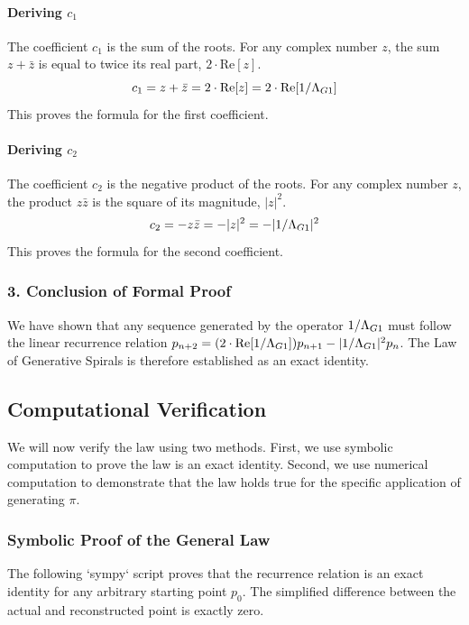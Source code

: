 \paragraph{Deriving $c_1$}
The coefficient $c_1$ is the sum of the roots. For any complex number $z$, the sum $z+\bar{z}$ is equal to twice its real part, $2 \cdot \text{Re}[z]$.
$$ c_1 = z + \bar{z} = 2 \cdot \text{Re}[z] = 2 \cdot \text{Re}[1/\Lambda_{G1}] $$
This proves the formula for the first coefficient.

\paragraph{Deriving $c_2$}
The coefficient $c_2$ is the negative product of the roots. For any complex number $z$, the product $z\bar{z}$ is the square of its magnitude, $|z|^2$.
$$ c_2 = -z\bar{z} = -|z|^2 = -|1/\Lambda_{G1}|^2 $$
This proves the formula for the second coefficient.

\subsubsection{3. Conclusion of Formal Proof}
We have shown that any sequence generated by the operator $1/\Lambda_{G1}$ must follow the linear recurrence relation $p_{n+2} = (2 \cdot \text{Re}[1/\Lambda_{G1}]) p_{n+1} - |1/\Lambda_{G1}|^2 p_n$. The Law of Generative Spirals is therefore established as an exact identity.

\subsection{Computational Verification}
We will now verify the law using two methods. First, we use symbolic computation to prove the law is an exact identity. Second, we use numerical computation to demonstrate that the law holds true for the specific application of generating $\pi$.

\subsubsection{Symbolic Proof of the General Law}
The following `sympy` script proves that the recurrence relation is an exact identity for any arbitrary starting point $p_0$. The simplified difference between the actual and reconstructed point is exactly zero.

